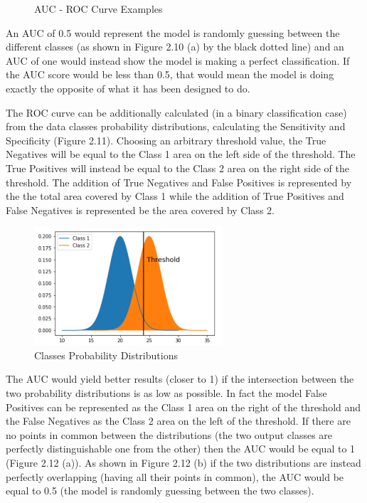 \begin{figure}[ht!]%
    \centering
    \qquad
    \caption{AUC - ROC Curve Examples}%
    \label{fig:example2}%
\end{figure}

An AUC of 0.5 would represent the model is randomly guessing between the different classes (as shown in Figure 2.10 (a) by the black dotted line) and an AUC of one would instead show the model is making a perfect classification. If the AUC score would be less than 0.5, that would mean the model is doing exactly the opposite of what it has been designed to do.

The ROC curve can be additionally calculated (in a binary classification case) from the data classes probability distributions, calculating the Sensitivity and Specificity (Figure 2.11). Choosing an arbitrary threshold value, the True Negatives will be equal to the Class 1 area on the left side of the threshold. The True Positives will instead be equal to the Class 2 area on the right side of the threshold. The addition of True Negatives and False Positives is represented by the the total area covered by Class 1 while the addition of True Positives and False Negatives is represented be the area covered by Class 2.

\begin{figure}[ht!]%
    \centering
    \includegraphics[width=7cm]{images/tre.PNG}%
    \caption{Classes Probability Distributions}%
\end{figure}

The AUC would yield better results (closer to 1) if the intersection between the two probability distributions is as low as possible. In fact the model False Positives can be represented as the Class 1 area on the right of the threshold and the False Negatives as the Class 2 area on the left of the threshold. If there are no points in common between the distributions (the two output classes are perfectly distinguishable one from the other) then the AUC would be equal to 1 (Figure 2.12 (a)). As shown in Figure 2.12 (b) if the two distributions are instead perfectly overlapping (having all their points in common), the AUC would be equal to 0.5 (the model is randomly guessing between the two classes).

